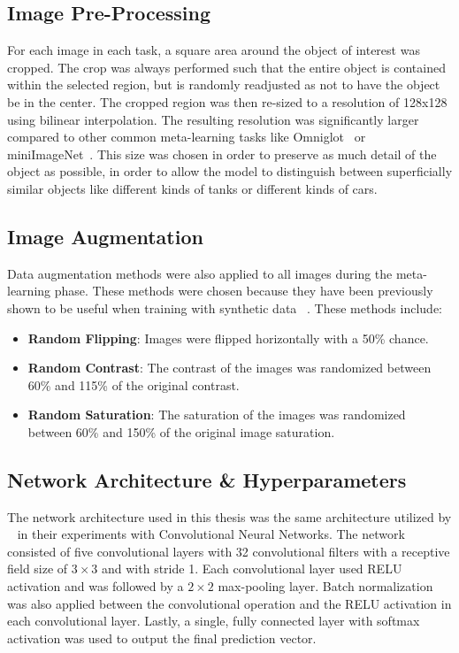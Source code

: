 \subsection{Image Pre-Processing}
For each image in each task, a square area around the object of interest was cropped. The crop was always performed such that the entire object is contained within the selected region, but is randomly readjusted as not to have the object be in the center. The cropped region was then re-sized to a resolution of 128x128 using bilinear interpolation. The resulting resolution was significantly larger compared to other common meta-learning tasks like Omniglot~\cite{omniglot} or miniImageNet~\cite{matching}. This size was chosen in order to preserve as much detail of the object as possible, in order to allow the model to distinguish between superficially similar objects like different kinds of tanks or different kinds of cars.

\subsection{Image Augmentation}
Data augmentation methods were also applied to all images during the meta-learning phase. These methods were chosen because they have been previously shown to be useful when training with synthetic data ~\cite{structureddomainrandomization}. These methods include:

\begin{itemize}
    \item \textbf{Random Flipping}: Images were flipped horizontally with a 50\% chance.
    \item \textbf{Random Contrast}: The contrast of the images was randomized between 60\% and 115\% of the original contrast.
    \item \textbf{Random Saturation}: The saturation of the images was randomized between 60\% and 150\% of the original image saturation.
\end{itemize}

\subsection{Network Architecture \& Hyperparameters}
The network architecture used in this thesis was the same architecture utilized by ~\textcite{maml} in their experiments with Convolutional Neural Networks. The network consisted of five convolutional layers with 32 convolutional filters with a receptive field size of $3\times3$ and with stride 1. Each convolutional layer used \gls{RELU} activation and was followed by a $2\times2$ max-pooling layer. Batch normalization was also applied between the convolutional operation and the \gls{RELU} activation in each convolutional layer. Lastly, a single, fully connected layer with softmax activation was used to output the final prediction vector.

